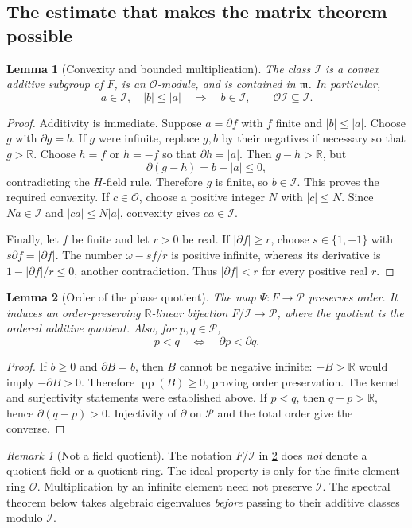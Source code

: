 \documentclass[11pt,a4paper]{article}
\numberwithin{equation}{section}
\newtheorem{lemma}[lemma]{Lemma}
\theoremstyle{definition}
\theoremstyle{remark}
\newtheorem{remark}[remark]{Remark}
\newcommand{\R}{\mathbb R}
\newcommand{\OO}{\mathcal O}
\newcommand{\mm}{\mathfrak m}
\newcommand{\PP}{\mathcal P}
\newcommand{\II}{\mathcal I}
\newcommand{\pp}{\operatorname{pp}}
\begin{document}
\subsection{The estimate that makes the matrix theorem possible}
\begin{lemma}[Convexity and bounded multiplication]\label{lem:ideal}
The class $\II$ is a convex additive subgroup of $F$, is an $\OO$-module,
and is contained in $\mm$. In particular,
\[
 a\in\II,\quad |b|\le |a|\quad\Longrightarrow\quad b\in\II,
 \qquad \OO\II\subseteq\II.
\]
\end{lemma}
\begin{proof}
Additivity is immediate. Suppose $a=\partial f$ with $f$ finite and
$|b|\le |a|$. Choose $g$ with $\partial g=b$. If $g$ were infinite, replace
$g,b$ by their negatives if necessary so that $g>\R$. Choose $h=f$ or
$h=-f$ so that $\partial h=|a|$. Then $g-h>\R$, but
\[
 \partial(g-h)=b-|a|\le0,
\]
contradicting the $H$-field rule. Therefore $g$ is finite, so $b\in\II$.
This proves the required convexity. If $c\in\OO$, choose a positive
integer $N$ with $|c|\le N$. Since $Na\in\II$ and
$|ca|\le N|a|$, convexity gives $ca\in\II$.

Finally, let $f$ be finite and let $r>0$ be real. If
$|\partial f|\ge r$, choose $s\in\{1,-1\}$ with
$s\partial f=|\partial f|$. The number $\omega-sf/r$ is positive infinite,
whereas its derivative is $1-|\partial f|/r\le0$, another contradiction.
Thus $|\partial f|<r$ for every positive real $r$.
\end{proof}

\begin{lemma}[Order of the phase quotient]\label{lem:phaseorder}
The map $\Psi:F\to\PP$ preserves order. It induces an order-preserving
$\R$-linear bijection $F/\II\to\PP$, where the quotient is the ordered
additive quotient. Also, for $p,q\in\PP$,
\[
 p<q\quad\Longleftrightarrow\quad\partial p<\partial q.
\]
\end{lemma}
\begin{proof}
If $b\ge0$ and $\partial B=b$, then $B$ cannot be negative infinite:
$-B>\R$ would imply $-\partial B>0$. Therefore $\pp(B)\ge0$, proving
order preservation. The kernel and surjectivity statements were established
above. If $p<q$, then $q-p>\R$, hence
$\partial(q-p)>0$. Injectivity of $\partial$ on $\PP$ and the total order
give the converse.
\end{proof}

\begin{remark}[Not a field quotient]
The notation $F/\II$ in \cref{lem:phaseorder} does \emph{not} denote a
quotient field or a quotient ring. The ideal property is only for the
finite-element ring $\OO$. Multiplication by an infinite element need not
preserve $\II$. The spectral theorem below takes algebraic eigenvalues
\emph{before} passing to their additive classes modulo $\II$.
\end{remark}
\end{document}
